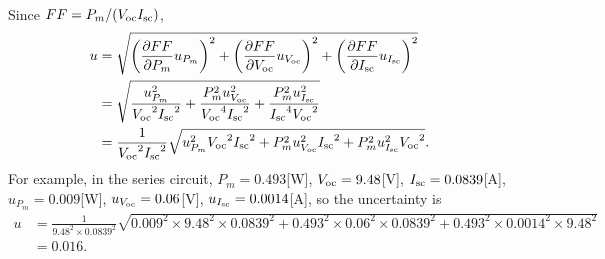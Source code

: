 \documentclass[a4paper]{article}
\newcommand{\V}{{V_{\rm oc}}}
\newcommand{\I}{{I_{\rm sc}}}
\begin{document}
    \paragraph{} Since $FF={P_m}/{(V_{\rm oc}I_{\rm sc})}$, 
    \begin{equation*}
        \begin{split}
            u&=\sqrt{\left(\frac{\partial FF}{\partial P_m}u_{P_m}\right)^2+\left(\frac{\partial FF}{\partial V_{\rm oc}}u_{V_{\rm oc}}\right)^2+\left(\frac{\partial FF}{\partial I_{\rm sc}}u_{I_{\rm sc}}\right)^2}\\
            &=\sqrt{\frac{u_{P_m}^2}{\V^2\I^2}+\frac{P_m^2u_\V^2}{\V^4\I^2}+\frac{P_m^2u_\I^2}{\I^4\V^2}}\\
            &=\frac{1}{\V^2\I^2}\sqrt{u_{P_m}^2\V^2\I^2+P_m^2u_\V^2\I^2+P_m^2u_\I^2\V^2}.
        \end{split}
    \end{equation*}
    For example, in the series circuit, $P_m=0.493$[W], $\V=9.48$[V], $\I=0.0839$[A], $u_{P_m}=0.009$[W], $u_\V=0.06$[V], $u_\I=0.0014$[A], so the uncertainty is 
    \begin{equation*}
        \begin{split}
            u&=\frac{1}{9.48^2\times 0.0839^2}\sqrt{0.009^2\times 9.48^2\times 0.0839^2+0.493^2\times 0.06^2\times 0.0839^2+0.493^2\times 0.0014^2\times 9.48^2}\\
            &=0.016.
        \end{split}    
    \end{equation*}
\end{document}
